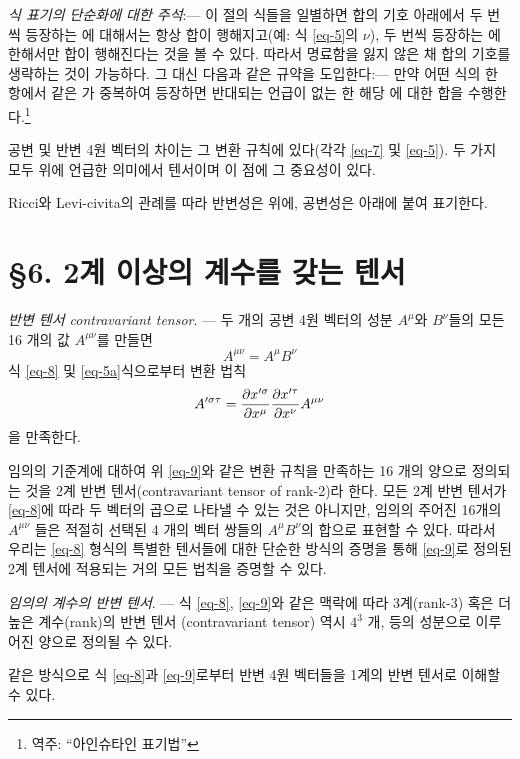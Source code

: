 \documentclass[b5paper]{article}
\begin{document}
\emph{식 표기의 단순화에 대한 주석}:--- 
이 절의 식들을 일별하면 합의 기호 아래에서 두 번씩 등장하는 \ind{}에 대해서는 항상 합이 행해지고(예: 식 \eqref{eq-5}의 \ind{} $\nu$), 두 번씩 등장하는 \ind{}에 한해서만 합이 행해진다는 것을 볼 수 있다. 따라서 명료함을 잃지 않은 채 합의 기호를 생략하는 것이 가능하다. 그 대신 다음과 같은 규약을 도입한다:--- 만약 어떤 식의 한 항에서 같은 가 중복하여 등장하면 반대되는 언급이 없는 한 해당 \ind{}에 대한 합을 수행한다.\footnote{역주: ``아인슈타인 표기법''}\par
공변 및 반변 4원 벡터의 차이는 그 변환 규칙에 있다(각각 \eqref{eq-7} 및 \eqref{eq-5}). 두 가지 모두 위에 언급한 의미에서 텐서이며 이 점에 그 중요성이 있다.\par
Ricci와 Levi-civita의 관례를 따라 반변성은 \ind{}\를 위에, 공변성은 \ind{}\를 아래에 붙여 표기한다.

\section*{\S 6. 2계 이상의 계수를 갖는 텐서}
\emph{반변 텐서 contravariant tensor}. --- 
두 개의 공변 4원 벡터의 성분 $A^\mu$와 $B^\nu$들의 모든 16 개의 값 $A^{\mu\nu}$를 만들면
\begin{equation} \label{eq-8}
	A^{\mu\nu} = A^\mu B^\nu
\end{equation}
식 \eqref{eq-8} 및 \eqref{eq-5a}식으로부터 변환 법칙
\begin{equation} \label{eq-9}
	A^{\prime\sigma\tau} = {\frac{{\partial}{x^{\prime\sigma}}}{{\partial}{x^\mu}}} {\frac{{\partial}{x^{\prime\tau}}}{{\partial}{x^\nu}}} A^{\mu\nu}
\end{equation}
을 만족한다. 

임의의 기준계에 대하여 위 \eqref{eq-9}와 같은 변환 규칙을 만족하는 16 개의 양으로 정의되는 것을 2계 반변 텐서(contravariant tensor of rank-2)라 한다. 모든 2계 반변 텐서가 \eqref{eq-8}에 따라 두 벡터의 곱으로 나타낼 수 있는 것은 아니지만, 임의의 주어진 16개의 $A^{\mu\nu}$ 들은 적절히 선택된 4 개의 벡터 쌍들의 $A^{\mu} B^{\nu}$의 합으로 표현할 수 있다.
따라서 우리는 \eqref{eq-8} 형식의 특별한 텐서들에 대한 단순한 방식의 증명을 통해 \eqref{eq-9}로 정의된 2계 텐서에 적용되는 거의 모든 법칙을 증명할 수 있다.

\emph{임의의 계수의 반변 텐서}. --- 
식 \eqref{eq-8}, \eqref{eq-9}와 같은 맥락에 따라 3계(rank-3) 혹은 더 높은 계수(rank)의 반변 텐서 (contravariant tensor) 역시  $4^3$ 개, 등의 성분으로 이루어진 양으로 정의될 수 있다.\par
같은 방식으로 식 \eqref{eq-8}과 \eqref{eq-9}로부터 반변 4원 벡터들을 1계의 반변 텐서로 이해할 수 있다.
\end{document}
